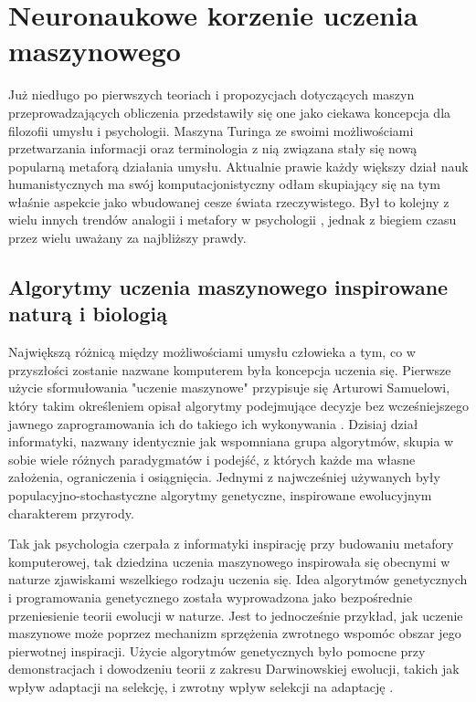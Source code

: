 \chapter{Neuronaukowe korzenie uczenia maszynowego}
\label{chapter1}

Już niedługo po pierwszych teoriach i propozycjach dotyczących maszyn przeprowadzających obliczenia przedstawiły się one jako ciekawa koncepcja dla filozofii umysłu i psychologii.
Maszyna Turinga ze swoimi możliwościami przetwarzania informacji oraz terminologia z nią związana stały się nową popularną metaforą działania umysłu.
Aktualnie prawie każdy większy dział nauk humanistycznych ma swój komputacjonistyczny odłam skupiający się na tym właśnie aspekcie jako wbudowanej cesze świata rzeczywistego.
Był to kolejny z wielu innych trendów analogii i metafory w psychologii \cite{vroon1987man}, jednak z biegiem czasu przez wielu uważany za najbliższy prawdy.

\section{Algorytmy uczenia maszynowego inspirowane naturą i biologią}

Największą różnicą między możliwościami umysłu człowieka a tym, co w przyszłości zostanie nazwane komputerem była koncepcja uczenia się.
Pierwsze użycie sformułowania "uczenie maszynowe" przypisuje się Arturowi Samuelowi, który takim określeniem opisał algorytmy podejmujące decyzje bez wcześniejszego jawnego zaprogramowania ich do takiego ich wykonywania \cite{koza1996automated}.
Dzisiaj dział informatyki, nazwany identycznie jak wspomniana grupa algorytmów, skupia w sobie wiele różnych paradygmatów i podejść, z których każde ma własne założenia, ograniczenia i osiągnięcia.
Jednymi z najwcześniej używanych były populacyjno-stochastyczne algorytmy genetyczne, inspirowane ewolucyjnym charakterem przyrody.

Tak jak psychologia czerpała z informatyki inspirację przy budowaniu metafory komputerowej, tak dziedzina uczenia maszynowego inspirowała się obecnymi w naturze zjawiskami wszelkiego rodzaju uczenia się.
Idea algorytmów genetycznych i programowania genetycznego została wyprowadzona jako bezpośrednie przeniesienie teorii ewolucji w naturze.
Jest to jednocześnie przykład, jak uczenie maszynowe może poprzez mechanizm sprzężenia zwrotnego wspomóc obszar jego pierwotnej inspiracji.
Użycie algorytmów genetycznych było pomocne przy demonstracjach i dowodzeniu teorii z zakresu Darwinowskiej ewolucji, takich jak wpływ adaptacji na selekcję, i zwrotny wpływ selekcji na adaptację \cite{bruderer1996organizational}.

